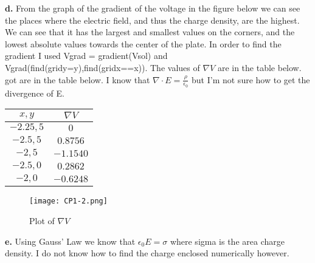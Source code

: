 \documentclass[english]{article}
\begin{document}
\begin{flushleft}
\textbf{d.} From the graph of the gradient of the voltage in the figure below we can see the places where the electric field, and thus the charge density, are the highest. We can see that it has the largest and smallest values on the corners, and the lowest absolute values towards the center of the plate. In order to find the gradient I used Vgrad = gradient(Vsol) and Vgrad(find(gridy=y),find(gridx==x)). The values of $\nabla V$ are in the table below. got are in the table below. I know that $\nabla \cdot E = \frac{\rho}{\epsilon_0}$ but I'm not sure how to get the divergence of E.
\begin{table}[H]
\begin{tabular}{|c|c|}
\hline
$x,y$ & $\nabla V$ \\
\hline
$-2.25,5$ & $0$ \\
$-2.5,5$ & $0.8756$ \\
$-2,5$ & $-1.1540$ \\
$-2.5,0$ & $0.2862$ \\
$-2,0$ & $-0.6248$ \\
\hline
\end{tabular}
\end{table}
\begin{figure}[H]
\begin{center}
\texttt{[image: CP1-2.png]}
\caption{Plot of $\nabla V$}
\end{center}
\end{figure}
\textbf{e.} Using Gauss' Law we know that $\epsilon_0E=\sigma$ where sigma is the area charge density. I do not know how to find the charge enclosed numerically however.

\end{flushleft}
\end{document}
